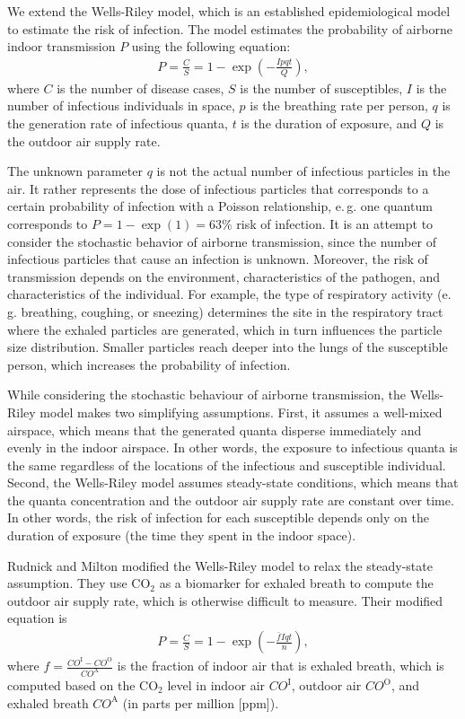 \documentclass[fleqn,11pt]{wlscirep_supp}
\newcommand\eg{e.\,g.\xspace}
\begin{document}
We extend the Wells-Riley model\cite{Riley1978AJE}, which is an established epidemiological model to estimate the risk of infection. The model estimates the probability of airborne indoor transmission $P$ using the following equation: 
\begin{align}
    P = \frac{C}{S} = 1 - \exp \left(-\frac{Ipqt}{Q}\right),
\end{align}
where $C$ is the number of disease cases, $S$ is the number of susceptibles, $I$ is the number of infectious individuals in space, $p$ is the breathing rate per person, $q$ is the generation rate of infectious quanta, $t$ is the duration of exposure, and $Q$ is the outdoor air supply rate. 

The unknown parameter $q$ is not the actual number of infectious particles in the air. It rather represents the dose of infectious particles that corresponds to a certain probability of infection with a Poisson relationship, \eg one quantum corresponds to $P = 1 - \exp (1) = 63\%$ risk of infection\cite{Rudnick2003IndoorAir}. It is an attempt to consider the stochastic behavior of airborne transmission, since the number of infectious particles that cause an infection is unknown. Moreover, the risk of transmission depends on the environment, characteristics of the pathogen, and characteristics of the individual. For example, the type of respiratory activity (\eg breathing, coughing, or sneezing) determines the site in the respiratory tract where the exhaled particles are generated, which in turn influences the particle size distribution\cite{Wei2016AMJIC}. Smaller particles reach deeper into the lungs of the susceptible person\cite{Wang2021Science}, which increases the probability of infection. 

While considering the stochastic behaviour of airborne transmission, the Wells-Riley model makes two simplifying assumptions. First, it assumes a well-mixed airspace, which means that the generated quanta disperse immediately and evenly in the indoor airspace. In other words, the exposure to infectious quanta is the same regardless of the locations of the infectious and susceptible individual. Second, the Wells-Riley model assumes steady-state conditions, which means that the quanta concentration and the outdoor air supply rate are constant over time. In other words, the risk of infection for each susceptible depends only on the duration of exposure (the time they spent in the indoor space). 

Rudnick and Milton\cite{Rudnick2003IndoorAir} modified the Wells-Riley model to relax the steady-state assumption. They use CO$_2$ as a biomarker for exhaled breath to compute the outdoor air supply rate, which is otherwise difficult to measure. Their modified equation is
\begin{align}
    P = \frac{C}{S} = 1 - \exp \left(-\frac{\bar{f}Iqt}{n}\right),
\end{align}
where $f = \frac{CO^{\text{I}}-CO^{\text{O}}}{CO^{\text{A}}}$ is the fraction of indoor air that is exhaled breath, which is computed based on the CO$_2$ level in indoor air $CO^{\text{I}}$, outdoor air $CO^{\text{O}}$, and exhaled breath $CO^{\text{A}}$ (in parts per million [ppm]). 
\end{document}
